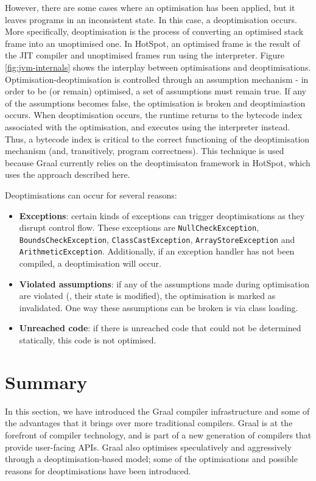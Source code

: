 However, there are some cases where an optimisation has been applied, but it leaves programs in an inconsistent state. In this case, a deoptimisation occurs. More specifically, deoptimisation \citep{Holzle1992} is the process of converting an optimised stack frame into an unoptimised one. In HotSpot, an optimised frame is the result of the JIT compiler and unoptimised frames run using the interpreter. Figure \ref{fig:jvm-internals} shows the interplay between optimisations and deoptimisations. Optimisation-deoptimisation is controlled through an assumption mechanism - in order to be (or remain) optimised, a set of assumptions must remain true. If any of the assumptions becomes false, the optimisation is broken and deoptimiastion occurs. When deoptimisation occurs, the runtime returns to the bytecode index associated with the optimisation, and executes using the interpreter instead. Thus, a bytecode index is critical to the correct functioning of the deoptimisation mechanism (and, transitively, program correctness). This technique is used because Graal currently relies on the deoptimisaton framework in HotSpot\texttrademark, which uses the approach described here. 

Deoptimisations can occur for several reasons:

\begin{itemize}
	\item \textbf{Exceptions}: certain kinds of exceptions can trigger deoptimisations as they disrupt control flow. These exceptions are \texttt{NullCheckException}, \texttt{BoundsCheckException}, \texttt{ClassCastException}, \texttt{ArrayStoreException} and \texttt{ArithmeticException}. Additionally, if an exception handler has not been compiled, a deoptimisation will occur.
	
	\item \textbf{Violated assumptions}: if any of the assumptions made during optimisation are violated (\ie, their state is modified), the optimisation is marked as invalidated. One way these assumptions can be broken is via class loading.
	
	\item \textbf{Unreached code}: if there is unreached code that could not be determined statically, this code is not optimised.
\end{itemize}

\section{Summary} \label{sec:graal/summary}
In this section, we have introduced the Graal compiler infrastructure and some of the advantages that it brings over more traditional compilers. Graal is at the forefront of compiler technology, and is part of a new generation of compilers that provide user-facing APIs. Graal also optimises speculatively and aggressively through a deoptimisation-based model; some of the optimisations and possible reasons for deoptimisations have been introduced.

